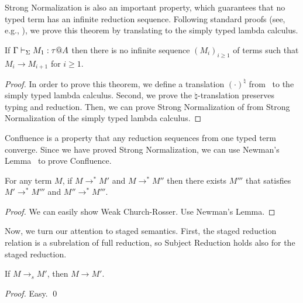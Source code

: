 Strong Normalization is also an important property, which guarantees that
no typed term has an infinite reduction sequence.
Following standard proofs (see, e.g., \cite{harper1993framework}), we prove this theorem by translating \LMD to the simply typed lambda calculus.

\begin{theorem}
	If $\G\V M_1:\tau@A$ then there is no infinite sequence $(M_i)_{i\ge1}$ of terms such that
	$M_i \longrightarrow M_{i+1}$ for $i\ge 1$.
\end{theorem}

\begin{proof}
	In order to prove this theorem, we define a translation $(\cdot)^\natural$ from \LMD\ to the simply typed lambda calculus.
	Second, we prove the $\natural$-translation preserves typing and reduction.
	Then, we can prove Strong Normalization of \LMD from Strong Normalization of the simply typed lambda calculus.
\end{proof}

Confluence is a property that any reduction sequences from one typed term converge.
Since we have proved Strong Normalization, we can use Newman's Lemma~\cite{DBLP:books/daglib/0092409} to prove Confluence.

\begin{theorem}[Confluence]
	For any term $M$, if $M \longrightarrow^* M'$ and $M \longrightarrow^* M''$ then
	there exists $M'''$ that satisfies $M' \longrightarrow^* M'''$ and $M'' \longrightarrow^* M'''$.
\end{theorem}

\begin{proof}
  We can easily show Weak Church-Rosser.  Use Newman's Lemma.
\end{proof}

Now, we turn our attention to staged semantics.  First, the staged
reduction relation is a subrelation of full reduction, so Subject
Reduction holds also for the staged reduction.

\begin{theorem}
  If $M \longrightarrow_s M'$, then $M \longrightarrow M'$.
\end{theorem}
\begin{proof}
  Easy.
 \qed
\end{proof}


